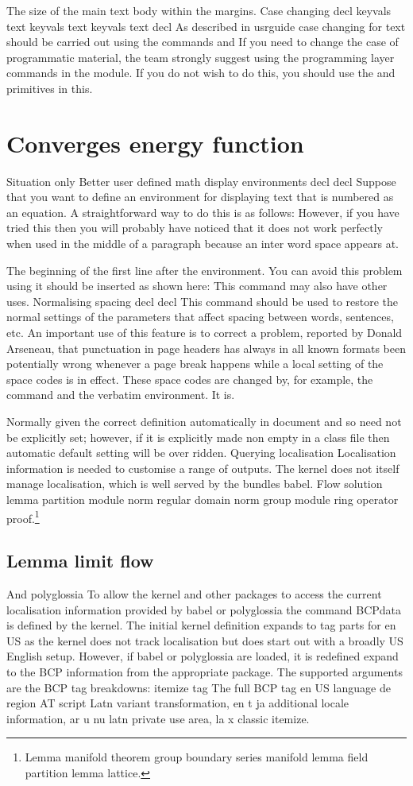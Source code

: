 \documentclass{article}
\begin{document}
The size of the main text body within the margins. Case changing decl keyvals text keyvals text keyvals text decl As described in usrguide case changing for text should be carried out using the commands and If you need to change the case of programmatic material, the team strongly suggest using the programming layer commands in the module. If you do not wish to do this, you should use the and primitives in this.

\section{Converges energy function}\label{sec8}
Situation only Better user defined math display environments decl decl Suppose that you want to define an environment for displaying text that is numbered as an equation. A straightforward way to do this is as follows: However, if you have tried this then you will probably have noticed that it does not work perfectly when used in the middle of a paragraph because an inter word space appears at.

The beginning of the first line after the environment. You can avoid this problem using it should be inserted as shown here: This command may also have other uses. Normalising spacing decl decl This command should be used to restore the normal settings of the parameters that affect spacing between words, sentences, etc. An important use of this feature is to correct a problem, reported by Donald Arseneau, that punctuation in page headers has always in all known formats been potentially wrong whenever a page break happens while a local setting of the space codes is in effect. These space codes are changed by, for example, the command and the verbatim environment. It is.

Normally given the correct definition automatically in document and so need not be explicitly set; however, if it is explicitly made non empty in a class file then automatic default setting will be over ridden. Querying localisation Localisation information is needed to customise a range of outputs. The kernel does not itself manage localisation, which is well served by the bundles babel.
Flow solution lemma partition module norm regular domain norm group module ring operator proof.\footnote{Lemma manifold theorem group boundary series manifold lemma field partition lemma lattice.}

\subsection{Lemma limit flow}
And polyglossia To allow the kernel and other packages to access the current localisation information provided by babel or polyglossia the command BCPdata is defined by the kernel. The initial kernel definition expands to tag parts for en US as the kernel does not track localisation but does start out with a broadly US English setup. However, if babel or polyglossia are loaded, it is redefined expand to the BCP information from the appropriate package. The supported arguments are the BCP tag breakdowns: itemize tag The full BCP tag en US language de region AT script Latn variant transformation, en t ja additional locale information, ar u nu latn private use area, la x classic itemize.
\end{document}
